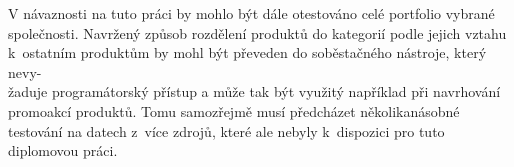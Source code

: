 V návaznosti na tuto práci by mohlo být dále otestováno celé portfolio vybrané společnosti.
Navržený způsob rozdělení produktů do kategorií podle jejich vztahu k~ostatním produktům by mohl být převeden do soběstačného nástroje, který nevy-\\žaduje programátorský přístup a může tak být využitý například při navrhování promoakcí produktů. Tomu samozřejmě musí předcházet několikanásobné testování na datech z~více zdrojů, které ale nebyly k~dispozici pro tuto diplomovou práci.


